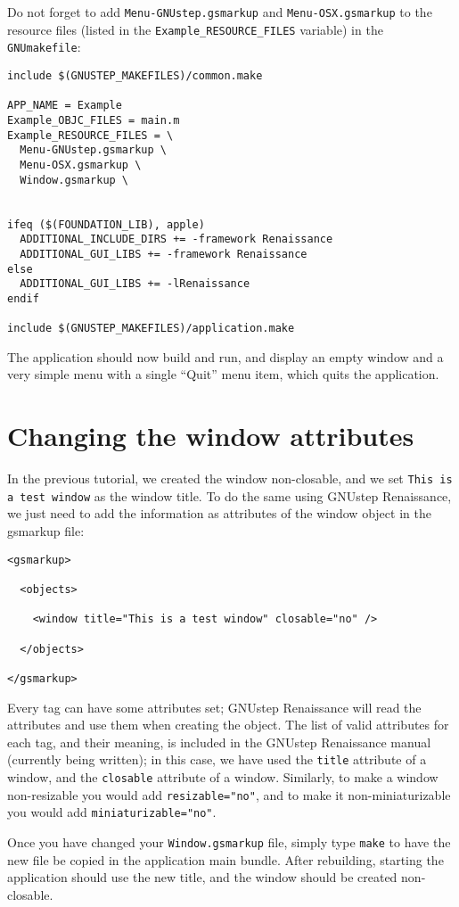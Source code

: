 \documentclass[a4paper]{article}
\begin{document}
Do not forget to add \texttt{Menu-GNUstep.gsmarkup} and
\texttt{Menu-OSX.gsmarkup} to the resource files (listed
in the \texttt{Example\_RESOURCE\_FILES} variable) in the
\texttt{GNUmakefile}:
\begin{verbatim}
include $(GNUSTEP_MAKEFILES)/common.make

APP_NAME = Example
Example_OBJC_FILES = main.m
Example_RESOURCE_FILES = \
  Menu-GNUstep.gsmarkup \
  Menu-OSX.gsmarkup \
  Window.gsmarkup \


ifeq ($(FOUNDATION_LIB), apple)
  ADDITIONAL_INCLUDE_DIRS += -framework Renaissance
  ADDITIONAL_GUI_LIBS += -framework Renaissance
else
  ADDITIONAL_GUI_LIBS += -lRenaissance
endif

include $(GNUSTEP_MAKEFILES)/application.make
\end{verbatim}

The application should now build and run, and display an empty window
and a very simple menu with a single ``Quit'' menu item, which quits
the application.

\section{Changing the window attributes}
In the previous tutorial, we created the window non-closable, and we
set \texttt{This is a test window} as the window title.  To do the same
using GNUstep Renaissance, we just need to add the information as
attributes of the window object in the gsmarkup file:
\begin{verbatim}
<gsmarkup>

  <objects>

    <window title="This is a test window" closable="no" />

  </objects>

</gsmarkup>
\end{verbatim}
Every tag can have some attributes set; GNUstep Renaissance will read
the attributes and use them when creating the object.  The list of
valid attributes for each tag, and their meaning, is included in the
GNUstep Renaissance manual (currently being written); in this case, we
have used the \texttt{title} attribute of a window, and the
\texttt{closable} attribute of a window.  Similarly, to make a window 
non-resizable you would add \texttt{resizable="no"}, and to make it
non-miniaturizable you would add \texttt{miniaturizable="no"}.

Once you have changed your \texttt{Window.gsmarkup} file, simply type
\texttt{make} to have the new file be copied in the application main bundle.
After rebuilding, starting the application should use the new title,
and the window should be created non-closable.
\end{document}
